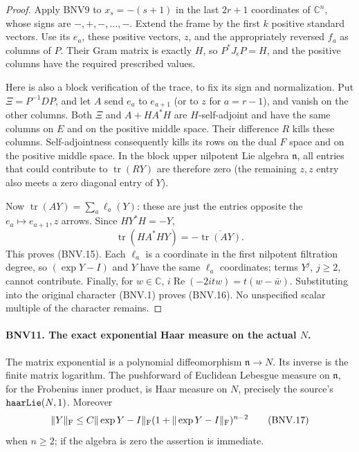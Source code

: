\documentclass[11pt,a4paper]{article}
\numberwithin{equation}{section}
\theoremstyle{remark}\newtheorem{remark}[theorem]{Remark}
\begin{document}
\begin{proof}
Apply BNV9 to $x_s=-(s+1)$ in the last $2r+1$ coordinates of
$\mathbb C^n$, whose signs are $-,+,-,\ldots,-$.  Extend the frame by the
first $k$ positive standard vectors.  Use its $e_a$, these positive
vectors, $z$, and the appropriately reversed $f_a$ as columns of $P$.
Their Gram matrix is exactly $H$, so $P^*J_\epsilon P=H$, and the
positive columns have the required prescribed values.

Here is also a block verification of the trace, to fix its sign and
normalization.  Put $\Xi=P^{-1}DP$, and let $A$ send $e_a$ to
$e_{a+1}$ (or to $z$ for $a=r-1$), and vanish on the other columns.
Both $\Xi$ and $A+HA^*H$ are $H$-self-adjoint and have the same columns
on $E$ and on the positive middle space.  Their difference $R$ kills
these columns.  Self-adjointness consequently kills its rows on the
dual $F$ space and on the positive middle space.  In the block upper
nilpotent Lie algebra $\mathfrak n$, all entries that could contribute
to $\operatorname{tr}(RY)$ are therefore zero (the remaining $z,z$
entry also meets a zero diagonal entry of $Y$).

Now $\operatorname{tr}(AY)=\sum_a\ell_a(Y)$: these are just the entries
opposite the $e_a\mapsto e_{a+1},z$ arrows.  Since $HY^*H=-Y$,
\[
 \operatorname{tr}(HA^*HY)
 =-\overline{\operatorname{tr}(AY)}.
\]
This proves (BNV.15).  Each $\ell_a$ is a coordinate in the first
nilpotent filtration degree, so $(\exp Y-I)$ and $Y$ have the same
$\ell_a$ coordinates; terms $Y^j$, $j\ge2$, cannot contribute.
Finally, for $w\in\mathbb C$, $i\operatorname{Re}(-2itw)=t(w-\bar w)$.
Substituting into the original character (BNV.1) proves (BNV.16).
No unspecified scalar multiple of the character remains.
\end{proof}

\paragraph{BNV11. The exact exponential Haar measure on the actual $N$.}
\label{claim:BNV11}
The matrix exponential is a polynomial diffeomorphism
$\mathfrak n\longrightarrow N$.  Its inverse is the finite matrix logarithm.
The pushforward of Euclidean Lebesgue measure on $\mathfrak n$, for the
Frobenius inner product, is Haar measure on $N$, precisely the source's
$\texttt{haar\allowbreak Lie}(N,1)$.  Moreover
\[
 \|Y\|_{\rm F}\le C\|\exp Y-I\|_{\rm F}
             (1+\|\exp Y-I\|_{\rm F})^{n-2}
 \tag{BNV.17}
\]
when $n\ge2$; if the algebra is zero the assertion is immediate.
\end{document}
